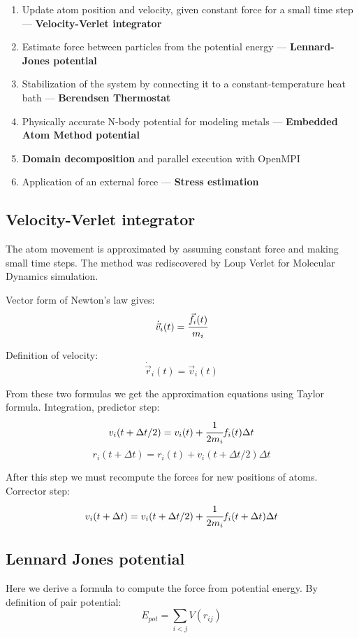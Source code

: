 \documentclass[12pt,a4paper]{article}
\newcommand{\mat}[1]{\vec{#1}}
\begin{document}
\begin{enumerate}
	\item Update atom position and velocity, given constant force for a small time step --- {\bf Velocity-Verlet integrator}
	\item Estimate force between particles from the potential energy --- {\bf Lennard-Jones potential}
	\item Stabilization of the system by connecting it to a constant-temperature heat bath --- {\bf Berendsen Thermostat}
	\item Physically accurate N-body potential for modeling metals --- {\bf Embedded Atom Method potential}
	\item {\bf Domain decomposition} and parallel execution with OpenMPI
	\item Application of an external force --- {\bf Stress estimation}
\end{enumerate}

\newpage
\subsection*{Velocity-Verlet integrator}

The atom movement is approximated by assuming constant force and making small time steps. The method was rediscovered by Loup Verlet \cite{verlet} for Molecular Dynamics simulation.

Vector form of Newton's law gives:
\[ \dot{\mat{v}}_i(t) = \cfrac{\mat{f}_i(t)}{m_i} \]

Definition of velocity:
\[ \dot{\mat{r}}_i(t) = \mat{v}_i(t) \]

From these two formulas we get the approximation equations using Taylor formula.
Integration, predictor step:
\[
v_i(t + \Delta t/2) = v_i(t) + \cfrac{1}{2m_i} f_i(t) \Delta t
\]
\[ r_i(t+\Delta t) = r_i(t) + v_i(t+ \Delta t/2) \Delta t \]

After this step we must recompute the forces for new positions of atoms. Corrector step:
\[ v_i(t+\Delta t) = v_i(t+\Delta t/2) + \cfrac{1}{2m_i}f_i(t+\Delta t) \Delta t \]

\subsection*{Lennard Jones potential}

Here we derive a formula to compute the force from potential energy. By definition of pair potential:
\[
E_{pot} = \sum_{i<j} V(r_{ij})
\]
\end{document}
